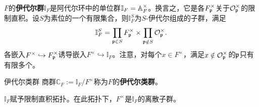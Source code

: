 $F$的\textbf{伊代尔群}$\mathbb{I}_F$是阿代尔环中的单位群$\mathbb{I}_F=\mathbb{A}_F^\times$。换言之，它是各$F_{\mathfrak{p}}^\times$关于$\mathcal O_{\mathfrak{p}}^\times$的限制直积。设$S$为素位的一个有限集合，则$\mathbb{I}_F^S$为$S$-伊代尔组成的子群，满足
\[\mathbb{I}_F^S=\prod_{\mathfrak{p}\in S}F_{\mathfrak{p}}^\times\times\prod_{\mathfrak{p}\notin S}\mathcal O_{\mathfrak{p}}^\times.\]
各嵌入$F^\times\hookrightarrow F_{\mathfrak{p}}^\times$诱导嵌入$F^\times\hookrightarrow\mathbb{I}_F$。注意，对每个$x\in F^\times$，满足$x\notin\mathcal O_{\mathfrak{p}}^\times$的$\mathfrak{p}$只有有限多个。
\begin{definition}{伊代尔类群}\label{L3S3O1}
商群$\mathbb{C}_F:=\mathbb{I}_F/F^\times$称为$F$的\textbf{伊代尔类群}。
\end{definition}
$\mathbb{I}_F$赋予限制直积拓扑。在此拓扑下，$F^\times$是$\mathbb{I}_F$的离散子群。

